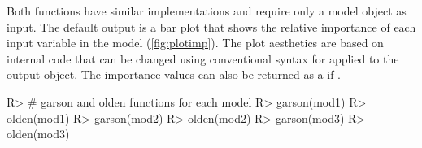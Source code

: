 \documentclass[article,shortnames]{jss}
\begin{document}
Both functions have similar implementations and require only a model object as input.  The default output is a  bar plot \citep[i.e., ,][]{Wickham09} that shows the relative importance of each input variable in the model (\cref{fig:plotimp}).  The plot aesthetics are based on internal code that can be changed using conventional syntax for  applied to the output object.  The importance values can also be returned as a  if .  

\begin{Schunk}
\begin{Sinput}
R> # garson and olden functions for each model
R> garson(mod1)
R> olden(mod1)
R> garson(mod2)
R> olden(mod2)
R> garson(mod3)
R> olden(mod3)
\end{Sinput}
\end{Schunk}
\end{document}
